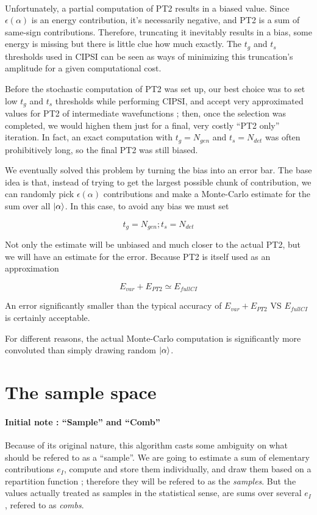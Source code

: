 \documentclass[./thesis.tex]{subfiles}
\begin{document}
\paragraph{}

Unfortunately, a partial computation of PT2 results in a biased value. Since $\epsilon(\alpha)$ is an energy contribution, it's necessarily negative, and PT2 is a sum of same-sign contributions. Therefore, truncating it inevitably results in a bias, some energy is missing but there is little clue how much exactly. The $t_g$ and $t_s$ thresholds used in CIPSI can be seen as ways of minimizing this truncation's amplitude for a given computational cost.

Before the stochastic computation of PT2 was set up, our best choice was to set low $t_g$ and $t_s$ thresholds while performing CIPSI, and accept very approximated values for PT2 of intermediate wavefunctions ; then, once the selection was completed, we would highen them just for a final, very costly ``PT2 only'' iteration. In fact, an exact computation with $t_g=N_{gen}$ and $t_s=N_{det}$ was often prohibitively long, so the final PT2 was still biased. 


We eventually solved this problem by turning the bias into an error bar. The base idea is that, instead of trying to get the largest possible chunk of contribution, we can randomly pick $\epsilon(\alpha)$ contributions and make a Monte-Carlo estimate for the sum over all $\ket \alpha$. In this case, to avoid any bias we must set

$$t_g = N_{gen} ; t_s = N_{det}$$

Not only the estimate will be unbiased and much closer to the actual PT2, but we will have an estimate for the error. Because PT2 is itself used as an approximation

$$E_{var} + E_{PT2} \simeq E_{fullCI}$$

An error significantly smaller than the typical accuracy of $E_{var} + E_{PT2}$ VS $E_{fullCI}$ is certainly acceptable.


For different reasons, the actual Monte-Carlo computation is significantly more convoluted than simply drawing random $\ket \alpha$.


\section{The sample space}


\paragraph{Initial note : ``Sample'' and ``Comb''}
Because of its original nature, this algorithm casts some ambiguity on what should be refered to as a ``sample''. We are going to estimate a sum of elementary contributions $e_I$, compute and store them individually, and draw them based on a repartition function ; therefore they will be refered to as the \emph{samples}. But the values actually treated as samples in the statistical sense, are sums over several $e_I$, refered to as \emph{combs}.
\end{document}
